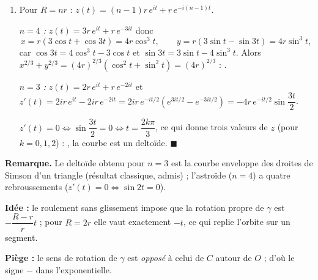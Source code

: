 \begin{enumerate}[itemsep=14pt]
  \item Pour $R=nr$ : $z(t)=(n-1)r\,e^{it}+r\,e^{-i(n-1)t}$.

  \emph{$n=4$ :} $z(t)=3r\,e^{it}+r\,e^{-3it}$ donc
  \[x=r(3\cos t+\cos3t)=4r\cos^3t,\qquad y=r(3\sin t-\sin3t)=4r\sin^3t,\]
  car $\cos3t=4\cos^3t-3\cos t$ et $\sin3t=3\sin t-4\sin^3t$. Alors $x^{2/3}+y^{2/3}=(4r)^{2/3}(\cos^2t+\sin^2t)=(4r)^{2/3}$ : .

  \emph{$n=3$ :} $z(t)=2r\,e^{it}+r\,e^{-2it}$ et $z'(t)=2ir\,e^{it}-2ir\,e^{-2it}=2ir\,e^{-it/2}\left(e^{3it/2}-e^{-3it/2}\right)=-4r\,e^{-it/2}\sin\dfrac{3t}2$.

  $z'(t)=0\iff\sin\dfrac{3t}{2}=0\iff t=\dfrac{2k\pi}{3}$, ce qui donne trois valeurs de $z$ (pour $k=0,1,2$) : , la courbe est un deltoïde. $\blacksquare$
\end{enumerate}

\textbf{Remarque.} Le deltoïde obtenu pour $n=3$ est la courbe enveloppe des droites de Simson d'un triangle (résultat classique, admis) ; l'astroïde ($n=4$) a quatre rebroussements ($z'(t)=0\iff\sin2t=0$).

\textbf{Idée :} le roulement sans glissement impose que la rotation propre de $\gamma$ est $-\dfrac{R-r}{r}t$ ; pour $R=2r$ elle vaut exactement $-t$, ce qui replie l'orbite sur un segment.

\textbf{Piège :} le sens de rotation de $\gamma$ est \emph{opposé} à celui de $C$ autour de $O$ ; d'où le signe $-$ dans l'exponentielle.
